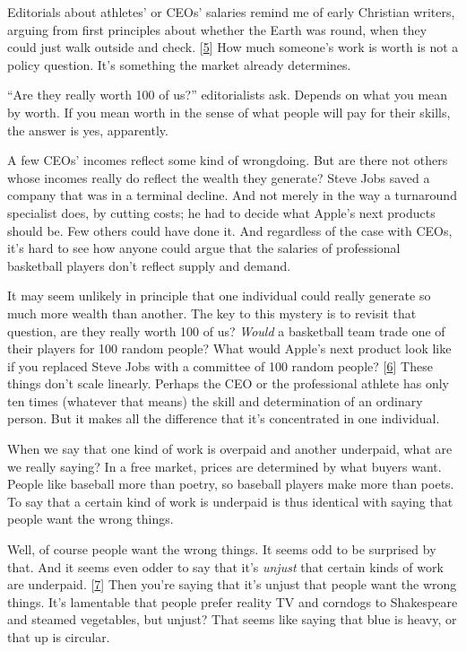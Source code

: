 Editorials about athletes' or CEOs' salaries remind me of early
Christian writers, arguing from first principles about whether the Earth
was round, when they could just walk outside and check.
{[}\hyperref[f5n]{5}{]} How much someone's work is worth is not a policy
question. It's something the market already determines.

``Are they really worth 100 of us?'' editorialists ask. Depends on what
you mean by worth. If you mean worth in the sense of what people will
pay for their skills, the answer is yes, apparently.

A few CEOs' incomes reflect some kind of wrongdoing. But are there not
others whose incomes really do reflect the wealth they generate? Steve
Jobs saved a company that was in a terminal decline. And not merely in
the way a turnaround specialist does, by cutting costs; he had to decide
what Apple's next products should be. Few others could have done it. And
regardless of the case with CEOs, it's hard to see how anyone could
argue that the salaries of professional basketball players don't reflect
supply and demand.

It may seem unlikely in principle that one individual could really
generate so much more wealth than another. The key to this mystery is to
revisit that question, are they really worth 100 of us? \emph{Would} a
basketball team trade one of their players for 100 random people? What
would Apple's next product look like if you replaced Steve Jobs with a
committee of 100 random people? {[}\hyperref[f6n]{6}{]} These things
don't scale linearly. Perhaps the CEO or the professional athlete has
only ten times (whatever that means) the skill and determination of an
ordinary person. But it makes all the difference that it's concentrated
in one individual.

When we say that one kind of work is overpaid and another underpaid,
what are we really saying? In a free market, prices are determined by
what buyers want. People like baseball more than poetry, so baseball
players make more than poets. To say that a certain kind of work is
underpaid is thus identical with saying that people want the wrong
things.

Well, of course people want the wrong things. It seems odd to be
surprised by that. And it seems even odder to say that it's
\emph{unjust} that certain kinds of work are underpaid.
{[}\hyperref[f7n]{7}{]} Then you're saying that it's unjust that people
want the wrong things. It's lamentable that people prefer reality TV and
corndogs to Shakespeare and steamed vegetables, but unjust? That seems
like saying that blue is heavy, or that up is circular.

